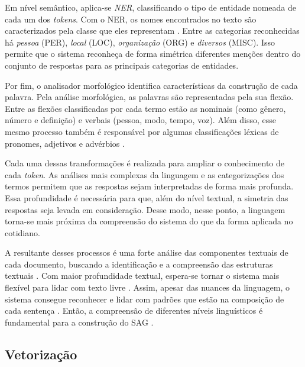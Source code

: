 Em nível semântico, aplica-se \textit{NER}, classificando o tipo de entidade nomeada de cada um dos \textit{tokens}. Com o NER, os nomes encontrados no texto são caracterizados pela classe que eles representam \cite{pirovani2019}. Entre as categorias reconhecidas há \textit{pessoa} (PER), \textit{local} (LOC), \textit{organização} (ORG) e \textit{diversos} (MISC). Isso permite que o sistema reconheça de forma simétrica diferentes menções dentro do conjunto de respostas para as principais categorias de entidades.

Por fim, o analisador morfológico identifica características da construção de cada palavra. Pela análise morfológica, as palavras são representadas pela sua flexão. Entre as flexões classificadas por cada termo estão as nominais (como gênero, número e definição) e verbais (pessoa, modo, tempo, voz). Além disso, esse mesmo processo também é responsável por algumas classificações léxicas de pronomes, adjetivos e advérbios \cite{marneffe2021}.

Cada uma dessas transformações é realizada para ampliar o conhecimento de cada \textit{token}. As análises mais complexas da linguagem e as categorizações dos termos permitem que as respostas sejam interpretadas de forma mais profunda. Essa profundidade é necessária para que, além do nível textual, a simetria das respostas seja levada em consideração. Desse modo, nesse ponto, a linguagem torna-se mais próxima da compreensão do sistema do que da forma aplicada no cotidiano.

A resultante desses processos é uma forte análise das componentes textuais de cada documento, buscando a identificação e a compreensão das estruturas textuais \cite{spalenza2020}. Com maior profundidade textual, espera-se tornar o sistema mais flexível para lidar com texto livre \cite{ding2020}. Assim, apesar das nuances da linguagem, o sistema consegue reconhecer e lidar com padrões que estão na composição de cada sentença \cite{filighera2020}. Então, a compreensão de diferentes níveis linguísticos é fundamental para a construção do SAG \cite{sahu2020}.


\subsection{Vetorização}
\label{subsec-vetorizacao}


